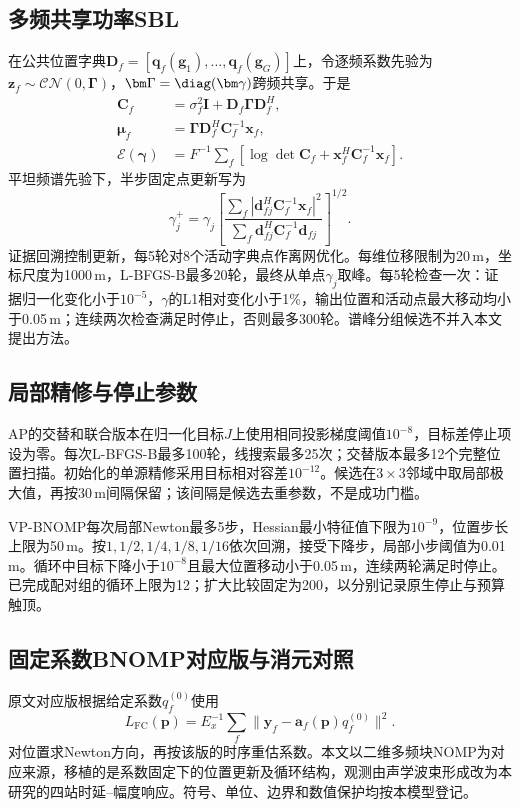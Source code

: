 \subsection{多频共享功率SBL}
在公共位置字典$\bm D_f=[\bm q_f(\bm g_1),\ldots,\bm q_f(\bm g_G)]$上，令逐频系数先验为$\bm z_f\sim\mathcal{CN}(0,\bm\Gamma)$，$\bm\Gamma=\diag(\bm\gamma)$跨频共享\cite{Nannuru2019}。于是
\begin{align}
 \bm C_f&=\sigma_f^2\bm I+\bm D_f\bm\Gamma\bm D_f^H,\label{eq:sblCov}\\
 \bm\mu_f&=\bm\Gamma\bm D_f^H\bm C_f^{-1}\bm x_f,\nonumber\\
 \mathcal E(\bm\gamma)&=F^{-1}\sum_f[\log\det\bm C_f+\bm x_f^H\bm C_f^{-1}\bm x_f] .\label{eq:sblEvidence}
\end{align}
平坦频谱先验下，半步固定点更新写为
\begin{equation}
 \gamma_j^+=\gamma_j\left[
 \frac{\sum_f|\bm d_{fj}^H\bm C_f^{-1}\bm x_f|^2}
 {\sum_f\bm d_{fj}^H\bm C_f^{-1}\bm d_{fj}}
 \right]^{1/2} .\label{eq:sblUpdate}
\end{equation}
证据回溯控制更新，每5轮对8个活动字典点作离网优化。每维位移限制为20\,m，坐标尺度为1000\,m，L-BFGS-B最多20轮，最终从单点$\gamma_j$取峰。每5轮检查一次：证据归一化变化小于$10^{-5}$，$\gamma$的L1相对变化小于1\%，输出位置和活动点最大移动均小于0.05\,m；连续两次检查满足时停止，否则最多300轮。谱峰分组候选不并入本文提出方法。

\subsection{局部精修与停止参数}
AP的交替和联合版本在归一化目标$J$上使用相同投影梯度阈值$10^{-8}$，目标差停止项设为零。每次L-BFGS-B最多100轮，线搜索最多25次；交替版本最多12个完整位置扫描。初始化的单源精修采用目标相对容差$10^{-12}$。候选在$3\times3$邻域中取局部极大值，再按30\,m间隔保留；该间隔是候选去重参数，不是成功门槛。

VP-BNOMP每次局部Newton最多5步，Hessian最小特征值下限为$10^{-9}$，位置步长上限为50\,m。按$1,1/2,1/4,1/8,1/16$依次回溯，接受下降步，局部小步阈值为0.01\,m。循环中目标下降小于$10^{-8}$且最大位置移动小于0.05\,m，连续两轮满足时停止。已完成配对组的循环上限为12；扩大比较固定为200，以分别记录原生停止与预算触顶。

\subsection{固定系数BNOMP对应版与消元对照}
原文对应版根据给定系数$q_f^{(0)}$使用
\begin{equation}
 L_{\mathrm{FC}}(\bm p)=E_x^{-1}\sum_f
 \|\bm y_f-\bm a_f(\bm p)q_f^{(0)}\|^2 .\label{eq:fixedcoef}
\end{equation}
对位置求Newton方向，再按该版的时序重估系数。本文以二维多频块NOMP\cite{Yang2022}为对应来源，移植的是系数固定下的位置更新及循环结构，观测由声学波束形成改为本研究的四站时延--幅度响应。符号、单位、边界和数值保护均按本模型登记。

